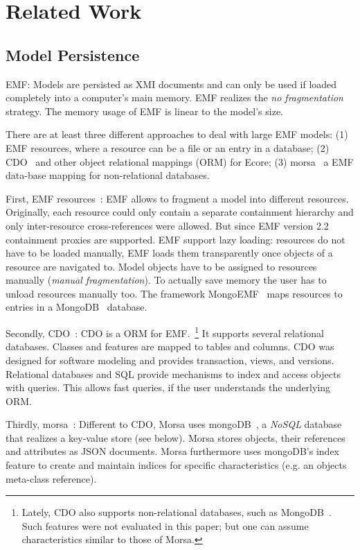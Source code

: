 \section{Related Work}
\label{sec:related_work}

\subsection{Model Persistence}
EMF: Models are persisted as XMI documents and can only be used if loaded completely into a computer's main memory. EMF realizes the \emph{no fragmentation} strategy. The memory usage of EMF is linear to the model's size.

There are at least three different approaches to deal with large EMF models: (1) EMF resources, where a resource can be a file or an entry in a database; (2) CDO~\cite{cdo} and other object relational mappings (ORM) for Ecore; (3) morsa~\cite{morsa2011} a EMF data-base mapping for non-relational databases.

First, EMF resources~\cite{emf2009}: EMF allows to fragment a model into different resources. Originally, each resource could only contain a separate containment hierarchy and only inter-resource cross-references were allowed. But since EMF version 2.2 containment proxies are supported. EMF support lazy loading: resources do not have to be loaded manually, EMF loads them transparently once objects of a resource are navigated to. Model objects have to be assigned to resources manually (\emph{manual fragmentation}). To actually save memory the user has to unload resources manually too. The framework MongoEMF~\cite{mongoEMF} maps resources to entries in a MongoDB~\cite{mongodb2010} database.

Secondly, CDO~\cite{cdo}: CDO is a ORM for EMF.~\footnote{Lately, CDO also supports non-relational databases, such as MongoDB~\cite{mongodb2010}. Such features were not evaluated in this paper; but one can assume characteristics similar to those of Morsa.}
It supports several relational databases. Classes and features are mapped to tables and columns. CDO was designed for software modeling and provides transaction, views, and versions.
Relational databases and SQL provide mechanisms to index and access objects with queries. This allows fast queries, if the user understands the underlying ORM.

Thirdly, morsa~\cite{morsa2011}: Different to CDO, Morsa uses mongoDB~\cite{mongodb2010}, a \emph{NoSQL} database that realizes a key-value store (see below). Morsa stores objects, their references and attributes as JSON documents. Morsa furthermore uses mongoDB's index feature to create and maintain indices for specific characteristics (e.g. an objects meta-class reference).

